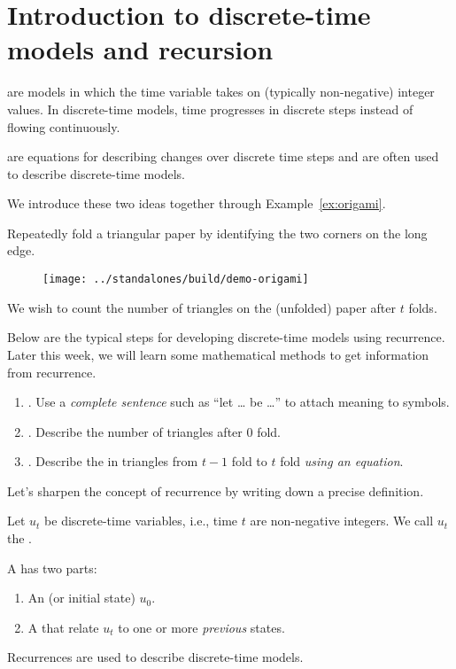 \documentclass[../main.tex]{subfiles}
\begin{document}
 \section{Introduction to discrete-time models and recursion}

 are models in which the time variable takes on (typically non-negative) integer values. In discrete-time models, time progresses in discrete steps instead of flowing continuously. 

 are equations for describing changes over discrete time steps and are often used to describe discrete-time models.

We introduce these two ideas together through Example~\ref{ex:origami}.  

\begin{example} \label{ex:origami}
  Repeatedly fold a triangular paper by identifying the two corners on the long edge. 
  \begin{figure}[H]
    \centering
    \texttt{[image: ../standalones/build/demo-origami]}
  \end{figure}

  We wish to count the number of triangles on the (unfolded) paper after \(t\) folds. 

  \faStar{} Below are the typical steps for developing discrete-time models using recurrence.  Later this week, we will learn some mathematical methods to get information from recurrence.

  \begin{enumerate}[wide]
    \item {}. Use a \emph{complete sentence} such as ``let \ldots{} be \ldots'' to attach meaning to symbols.
    \item {}. Describe the number of triangles after \(0\) fold.
    \item {}. Describe the  in triangles from \(t-1\) fold to \(t\) fold \emph{using an equation}.
  \end{enumerate}
\end{example}

Let's sharpen the concept of recurrence by writing down a precise definition. 

\begin{definition}[recurrence]
  Let \(u_{t}\) be discrete-time variables, i.e., time \(t\) are non-negative integers.  We call \(u_{t}\) the . 

  A  has two parts:
  \begin{enumerate}
    \item An  (or initial state) \(u_{0}\).
    \item A  that relate \(u_{t}\) to one or more \emph{previous} states.
  \end{enumerate}

  \faExclamationTriangle{} Recurrences are used to describe discrete-time models.
\end{definition}
\end{document}
